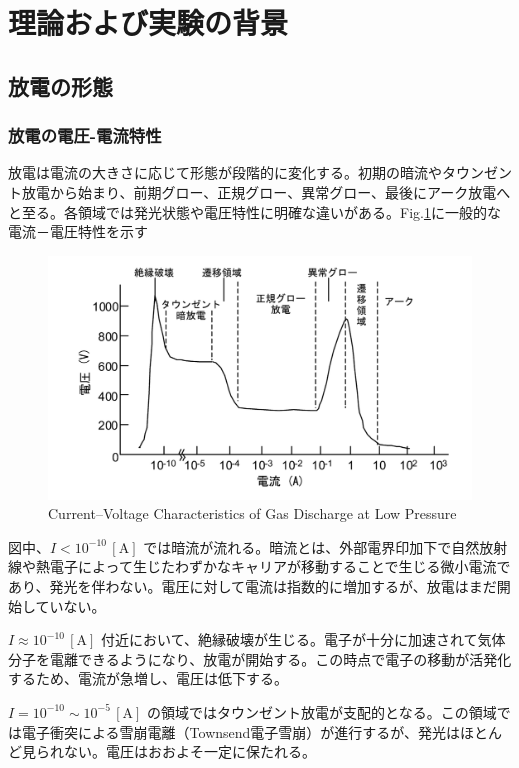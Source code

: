 \documentclass[dvipdfmx]{jsarticle}
\newcommand{\figlab}[1]{Fig.\ref{fig:#1}}%
\begin{document}
\section{理論および実験の背景}
\subsection{放電の形態}
\subsubsection*{放電の電圧-電流特性}
放電は電流の大きさに応じて形態が段階的に変化する。初期の暗流やタウンゼント放電から始まり、前期グロー、正規グロー、異常グロー、最後にアーク放電へと至る。各領域では発光状態や電圧特性に明確な違いがある。\figlab{1}に一般的な電流－電圧特性を示す
 
 \begin{figure}[H]
 \centering
 \includegraphics[scale=0.4]{assets/IV-1.png}
 \caption{Current–Voltage Characteristics of Gas Discharge at Low Pressure}\label{fig:1}
 \end{figure}
図中、$I < 10^{-10}\,\mathrm{[A]}$ では暗流が流れる。暗流とは、外部電界印加下で自然放射線や熱電子によって生じたわずかなキャリアが移動することで生じる微小電流であり、発光を伴わない。電圧に対して電流は指数的に増加するが、放電はまだ開始していない。

$I \approx 10^{-10}\,\mathrm{[A]}$ 付近において、絶縁破壊が生じる。電子が十分に加速されて気体分子を電離できるようになり、放電が開始する。この時点で電子の移動が活発化するため、電流が急増し、電圧は低下する。

$I = 10^{-10} \sim 10^{-5}\,\mathrm{[A]}$ の領域ではタウンゼント放電が支配的となる。この領域では電子衝突による雪崩電離（Townsend電子雪崩）が進行するが、発光はほとんど見られない。電圧はおおよそ一定に保たれる。
\end{document}
